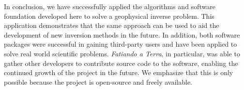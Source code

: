 In conclusion,
we have successfully applied the algorithms and software foundation developed
here to solve a geophysical inverse problem.
This application demonstrates that the same approach can be used to aid the
development of new inversion methods in the future.
In addition, both software packages were successful in gaining third-party
users and have been applied to solve real world scientific problems.
\textit{Fatiando a Terra}, in particular, was able to gather other developers
to contribute source code to the software, enabling the continued growth of the
project in the future.
We emphasize that this is only possible because the project is open-source and
freely available.
